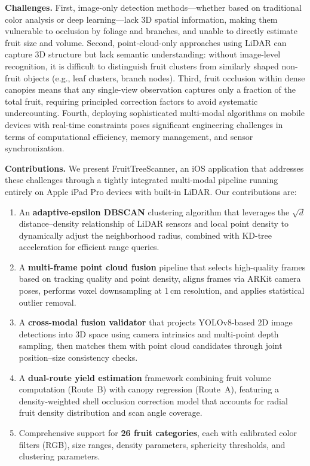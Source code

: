 \documentclass[article,final]{iclr2024_conference}
\newcommand{\theMethod}{FruitTreeScanner}
\begin{document}
\textbf{Challenges.}
First, image-only detection methods---whether based on traditional color analysis or deep learning---lack 3D spatial information, making them vulnerable to occlusion by foliage and branches, and unable to directly estimate fruit size and volume. Second, point-cloud-only approaches using LiDAR can capture 3D structure but lack semantic understanding: without image-level recognition, it is difficult to distinguish fruit clusters from similarly shaped non-fruit objects (e.g., leaf clusters, branch nodes). Third, fruit occlusion within dense canopies means that any single-view observation captures only a fraction of the total fruit, requiring principled correction factors to avoid systematic undercounting. Fourth, deploying sophisticated multi-modal algorithms on mobile devices with real-time constraints poses significant engineering challenges in terms of computational efficiency, memory management, and sensor synchronization.

\textbf{Contributions.}
We present \theMethod{}, an iOS application that addresses these challenges through a tightly integrated multi-modal pipeline running entirely on Apple iPad Pro devices with built-in LiDAR. Our contributions are:
\begin{enumerate}[leftmargin=*,nosep]
    \item An \textbf{adaptive-epsilon DBSCAN} clustering algorithm that leverages the $\sqrt{d}$ distance--density relationship of LiDAR sensors and local point density to dynamically adjust the neighborhood radius, combined with KD-tree acceleration for efficient range queries.
    \item A \textbf{multi-frame point cloud fusion} pipeline that selects high-quality frames based on tracking quality and point density, aligns frames via ARKit camera poses, performs voxel downsampling at 1\,cm resolution, and applies statistical outlier removal.
    \item A \textbf{cross-modal fusion validator} that projects YOLOv8-based 2D image detections into 3D space using camera intrinsics and multi-point depth sampling, then matches them with point cloud candidates through joint position--size consistency checks.
    \item A \textbf{dual-route yield estimation} framework combining fruit volume computation (Route~B) with canopy regression (Route~A), featuring a density-weighted shell occlusion correction model that accounts for radial fruit density distribution and scan angle coverage.
    \item Comprehensive support for \textbf{26 fruit categories}, each with calibrated color filters (RGB), size ranges, density parameters, sphericity thresholds, and clustering parameters.
\end{enumerate}
\end{document}
